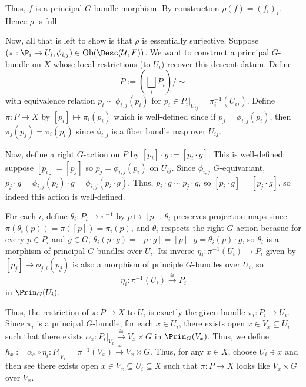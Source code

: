 \begin{example}
Thus, \( f \) is a principal \( G \)-bundle morphism. By construction \( \rho(f) = (f_i)_i \). Hence \( \rho \) is full.

Now, all that is left to show is that \( \rho \) is essentially surjective. Suppose \( (\pi: \P_i \to U_i,\phi_{i,j}) \in \text{Ob}(\Desc(\mathcal{U},F)) \). We want to construct a principal \( G \)-bundle on \( X \) whose local restrictions (to \( U_i \)) recover this descent datum. Define
\[ P:= \left( \bigsqcup_i P_i \right)/\sim \]
with equivalence relation \( p_i \sim \phi_{i,j}(p_i) \) for \( p_i \in P_i|_{U_{ij}} = \pi_i^{-1}(U_{ij}) \). Define \( \pi: P \to X \) by \( [p_i] \mapsto \pi_i(p_i) \) which is well-defined since if \( p_j = \phi_{i,j}(p_i) \), then \( \pi_j(p_j) = \pi_i(p_i) \) since \( \phi_{i,j} \) is a fiber bundle map over \( U_{ij} \).

Now, define a right \( G \)-action on \( P \) by \( [p_i]\cdot g := [p_i \cdot g] \). This is well-defined: suppose \( [p_i] = [p_j] \) so \( p_j = \phi_{i,j}(p_i) \) on \( U_{ij} \). Since \( \phi_{i,j} \) \( G \)-equivariant, \( p_j \cdot g = \phi_{i,j}(p_i) \cdot g = \phi_{i,j}(p_i \cdot g) \). Thus, \( p_i \cdot g \sim p_j \cdot g \), so \( [p_i \cdot g] = [p_j \cdot g] \), so indeed this action is well-defined.

For each \( i \), define \( \theta_i: P_i \to \pi^{-1} \) by \( p \mapsto [p] \). \( \theta_i \) preserves projection maps since \( \pi(\theta_i(p)) = \pi([p]) = \pi_i(p) \), and \( \theta_i \) respects the right \( G \)-action becasue for every \( p \in P_i \) and \( g \in G \), \( \theta_i(p\cdot g) = [p\cdot g] = [p] \cdot g = \theta_i(p)\cdot g \), so \( \theta_i \) is a morphism of principal \( G \)-bundles over \( U_i \). Its inverse \( \eta_i: \pi^{-1}(U_i) \to P_i \) given by \( [p_j] \mapsto \phi_{j,i}(p_j) \) is also a morphism of principle \( G \)-bundles over \( U_i \), so
\[ \eta_i: \pi^{-1}(U_i) \xrightarrow{\cong} P_i \]
in \( \Prin_G(U_i) \).

Thus, the restriction of \( \pi:P \to X \) to \( U_i \) is exactly the given bundle \( \pi_i:P_i\to U_i \). Since \( \pi_i \) is a principal \( G \)-bundle, for each \( x\in U_i \), there exists open \( x \in V_x \subseteq U_i \) such that there exists \( \alpha_x: P_i|_{V_x} \xrightarrow{\cong} V_x \times G \) in \( \Prin_G(V_x) \). Thus, we define \( h_x:= \alpha_x \circ \eta_i: P|_{V_x} = \pi^{-1}(V_x) \xrightarrow{\cong} V_x \times G \). Thus, for any \( x \in X \), choose \( U_i \ni x \) and then see there exists open \( x\in V_x \subseteq U_i \subseteq X \) such that \( \pi: P \to X \) looks like \( V_x \times G \) over \( V_x \).


\end{example}
